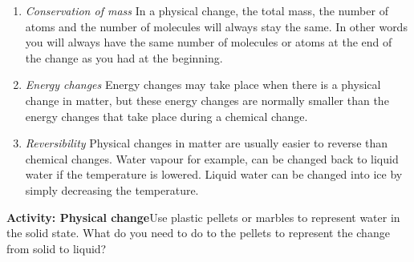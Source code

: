 \begin{enumerate}[noitemsep, label=\textbf{\arabic*}. ]
\begin{figure}[H]
 \end{figure}       
\label{m38709*uid221}\item \textsl{Conservation of mass}\newline
    In a physical change, the total mass, the number of atoms and the number of molecules will always stay the same. In other words you will always have the same number of molecules or atoms at the end of the change as you had at the beginning. 
\label{m38709*uid3}\item \textsl{Energy changes}\newline
Energy changes may take place when there is a physical change in matter, but these energy changes are normally smaller than the energy changes that take place during a chemical change.
\label{m38709*uid4}\item \textsl{Reversibility}\newline
Physical changes in matter are usually easier to reverse than chemical changes. Water vapour for example, can be changed back to liquid water if the temperature is lowered. Liquid water can be changed into ice by simply decreasing the temperature.
\end{enumerate}
        \label{m38709*eip-904}\noindent{}\textbf{Activity: Physical change}Use plastic pellets or marbles to represent water in the solid state. What do you need to do to the pellets to represent the change from solid to liquid? \par 
    \label{m38709*cid3}

